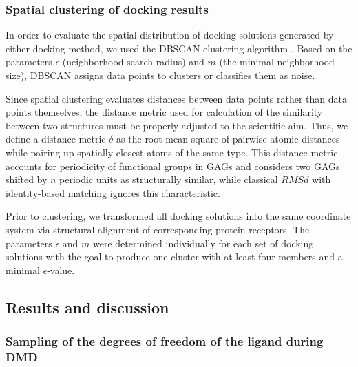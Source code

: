 \subsubsection{Spatial clustering of docking results}
In order to evaluate the spatial distribution of docking solutions generated by
either docking method, we used the DBSCAN clustering algorithm
\cite{dbscan_ester1996}. Based on the  parameters $\epsilon$ (neighborhood
search radius) and $m$ (the minimal neighborhood size), DBSCAN assigns data
points to clusters or classifies them as noise.

Since spatial clustering evaluates distances between data points rather than
data points themselves, the distance metric used for calculation of the
similarity between two structures must be properly adjusted to the scientific
aim. Thus, we define a distance metric $\delta$ as the root mean square of
pairwise atomic distances while pairing up spatially closest atoms of the same
type. This distance metric accounts for periodicity of functional groups in GAGs
and considers two GAGs shifted by $n$ periodic units as structurally similar,
while classical $RMSd$ with identity-based matching ignores this characteristic.

Prior to clustering, we transformed all docking solutions into the same
coordinate system via structural alignment of corresponding protein receptors.
The parameters $\epsilon$ and $m$ were determined individually for each set of
docking solutions with the goal to produce one cluster with at least four
members and a minimal $\epsilon$-value.



\subsection{Results and discussion}

\subsubsection{Sampling of the degrees of freedom of the ligand during DMD}

